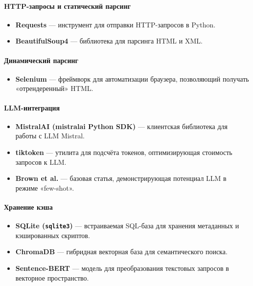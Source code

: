 \paragraph{HTTP-запросы и статический парсинг}
\begin{itemize}
    \item \textbf{Requests}\cite{RequestsDocumentation} — инструмент для отправки HTTP-запросов в Python.
    \item \textbf{BeautifulSoup4}\cite{BeautifulSoupDocumentation} — библиотека для парсинга HTML и XML.
\end{itemize}

\paragraph{Динамический парсинг}
\begin{itemize}
    \item \textbf{Selenium}\cite{SeleniumDocumentation} — фреймворк для автоматизации браузера, позволяющий получать «отрендеренный» HTML.
\end{itemize}

\paragraph{LLM-интеграция}
\begin{itemize}
    \item \textbf{MistralAI (mistralai Python SDK)}\cite{MistralAIDocumentation} — клиентская библиотека для работы с LLM Mistral.
    \item \textbf{tiktoken}\cite{TiktokenDocumentation} — утилита для подсчёта токенов, оптимизирующая стоимость запросов к LLM.
    \item \textbf{Brown et al.}\cite{Brown2020} — базовая статья, демонстрирующая потенциал LLM в режиме «few-shot».
\end{itemize}

\paragraph{Хранение кэша}
\begin{itemize}
    \item \textbf{SQLite (\texttt{sqlite3})}\cite{SQLiteDocumentation} — встраиваемая SQL-база для хранения метаданных и кэшированных скриптов.
    \item \textbf{ChromaDB}\cite{ChromaDBDocumentation} — гибридная векторная база для семантического поиска.
    \item \textbf{Sentence-BERT}\cite{Reimers2019} — модель для преобразования текстовых запросов в векторное пространство.
\end{itemize}

